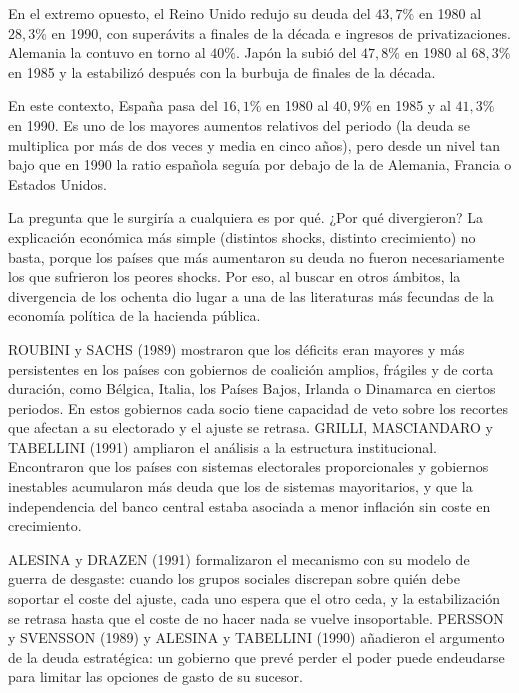 \documentclass[10pt,a4paper]{article}
\begin{document}
En el extremo opuesto, el Reino Unido redujo su deuda del $43,7\%$ en 1980 al $28,3\%$ en 1990, con superávits a finales de la década e ingresos de privatizaciones. Alemania la contuvo en torno al $40\%$. Japón la subió del $47,8\%$ en 1980 al $68,3\%$ en 1985 y la estabilizó después con la burbuja de finales de la década.

En este contexto, España pasa del $16,1\%$ en 1980 al $40,9\%$ en 1985 y al $41,3\%$ en 1990. Es uno de los mayores aumentos relativos del periodo (la deuda se multiplica por más de dos veces y media en cinco años), pero desde un nivel tan bajo que en 1990 la ratio española seguía por debajo de la de Alemania, Francia o Estados Unidos.

La pregunta que le surgiría a cualquiera es por qué. ¿Por qué divergieron? La explicación económica más simple (distintos shocks, distinto crecimiento) no basta, porque los países que más aumentaron su deuda no fueron necesariamente los que sufrieron los peores shocks. Por eso, al buscar en otros ámbitos, la divergencia de los ochenta dio lugar a una de las literaturas más fecundas de la economía política de la hacienda pública.

ROUBINI y SACHS (1989) mostraron que los déficits eran mayores y más persistentes en los países con gobiernos de coalición amplios, frágiles y de corta duración, como Bélgica, Italia, los Países Bajos, Irlanda o Dinamarca en ciertos periodos. En estos gobiernos cada socio tiene capacidad de veto sobre los recortes que afectan a su electorado y el ajuste se retrasa. GRILLI, MASCIANDARO y TABELLINI (1991) ampliaron el análisis a la estructura institucional. Encontraron que los países con sistemas electorales proporcionales y gobiernos inestables acumularon más deuda que los de sistemas mayoritarios, y que la independencia del banco central estaba asociada a menor inflación sin coste en crecimiento. 

ALESINA y DRAZEN (1991) formalizaron el mecanismo con su modelo de guerra de desgaste: cuando los grupos sociales discrepan sobre quién debe soportar el coste del ajuste, cada uno espera que el otro ceda, y la estabilización se retrasa hasta que el coste de no hacer nada se vuelve insoportable. PERSSON y SVENSSON (1989) y ALESINA y TABELLINI (1990) añadieron el argumento de la deuda estratégica: un gobierno que prevé perder el poder puede endeudarse para limitar las opciones de gasto de su sucesor.
\end{document}
